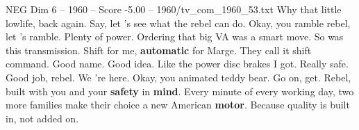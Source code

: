 \begin{textsample}{NEG Dim 6 – 1960 – Score -5.00 – 1960/tv\_com\_1960\_53.txt}  \label{ex:f6_neg_071}
Why that little lowlife, back again.
Say, let 's see what the rebel can do.
Okay, you ramble rebel, let 's ramble.
Plenty of power.
Ordering that big VA was a smart move.
So was this transmission.
Shift for me, \textbf{automatic} for Marge.
They call it shift command.
Good name.
Good idea.
Like the power disc brakes I got.
Really safe.
Good job, rebel.
We 're here.
Okay, you animated teddy bear.
Go on, get.
Rebel, built with you and your \textbf{safety} in \textbf{mind}.
Every minute of every working day, two more families make their choice a new American \textbf{motor}.
Because quality is built in, not added on.

\end{textsample}
